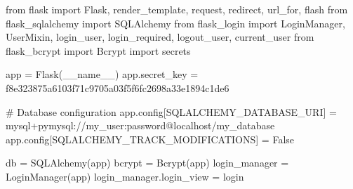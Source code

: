 \documentclass[
  letterpaper,
  DIV=11,
  numbers=noendperiod]{scrreprt}
\newenvironment{Shaded}{\begin{snugshade}}{\end{snugshade}}
\newcommand{\CommentTok}[1]{\textcolor[rgb]{0.37,0.37,0.37}{#1}}
\newcommand{\ImportTok}[1]{\textcolor[rgb]{0.00,0.46,0.62}{#1}}
\newcommand{\NormalTok}[1]{\textcolor[rgb]{0.00,0.23,0.31}{#1}}
\newcommand{\OperatorTok}[1]{\textcolor[rgb]{0.37,0.37,0.37}{#1}}
\newcommand{\StringTok}[1]{\textcolor[rgb]{0.13,0.47,0.30}{#1}}
\newcommand{\VariableTok}[1]{\textcolor[rgb]{0.07,0.07,0.07}{#1}}
\begin{document}
\begin{Shaded}
\begin{Highlighting}[]
\ImportTok{from}\NormalTok{ flask }\ImportTok{import}\NormalTok{ Flask, render\_template, request, redirect, url\_for, flash}
\ImportTok{from}\NormalTok{ flask\_sqlalchemy }\ImportTok{import}\NormalTok{ SQLAlchemy}
\ImportTok{from}\NormalTok{ flask\_login }\ImportTok{import}\NormalTok{ LoginManager, UserMixin, login\_user, login\_required, logout\_user, current\_user}
\ImportTok{from}\NormalTok{ flask\_bcrypt }\ImportTok{import}\NormalTok{ Bcrypt}
\ImportTok{import}\NormalTok{ secrets}

\NormalTok{app }\OperatorTok{=}\NormalTok{ Flask(}\VariableTok{\_\_name\_\_}\NormalTok{)}
\NormalTok{app.secret\_key }\OperatorTok{=} \StringTok{\textquotesingle{}f8e323875a6103f71c9705a03f5f6fc2698a33e1894c1de6\textquotesingle{}}

\CommentTok{\# Database configuration}
\NormalTok{app.config[}\StringTok{\textquotesingle{}SQLALCHEMY\_DATABASE\_URI\textquotesingle{}}\NormalTok{] }\OperatorTok{=} \StringTok{\textquotesingle{}mysql+pymysql://my\_user:password@localhost/my\_database\textquotesingle{}}
\NormalTok{app.config[}\StringTok{\textquotesingle{}SQLALCHEMY\_TRACK\_MODIFICATIONS\textquotesingle{}}\NormalTok{] }\OperatorTok{=} \VariableTok{False}

\NormalTok{db }\OperatorTok{=}\NormalTok{ SQLAlchemy(app)}
\NormalTok{bcrypt }\OperatorTok{=}\NormalTok{ Bcrypt(app)}
\NormalTok{login\_manager }\OperatorTok{=}\NormalTok{ LoginManager(app)}
\NormalTok{login\_manager.login\_view }\OperatorTok{=} \StringTok{\textquotesingle{}login\textquotesingle{}}


\end{Highlighting}
\end{Shaded}
\end{document}
